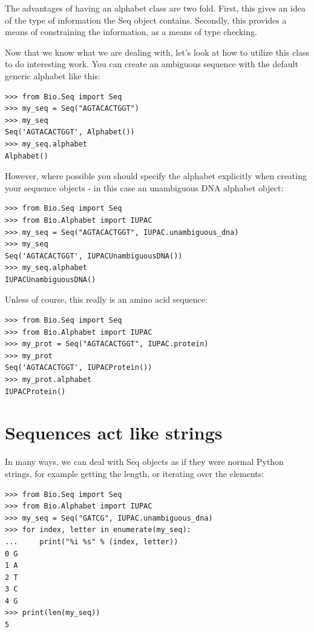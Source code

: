\documentclass{report}
\begin{document}
The advantages of having an alphabet class are two fold. First, this gives an idea of the type of information the Seq object contains. Secondly, this provides a means of constraining the information, as a means of type checking.

Now that we know what we are dealing with, let's look at how to utilize this class to do interesting work.
You can create an ambiguous sequence with the default generic alphabet like this:

\begin{verbatim}
>>> from Bio.Seq import Seq
>>> my_seq = Seq("AGTACACTGGT")
>>> my_seq
Seq('AGTACACTGGT', Alphabet())
>>> my_seq.alphabet
Alphabet()
\end{verbatim}

However, where possible you should specify the alphabet explicitly when creating your sequence objects - in this case an unambiguous DNA alphabet object:

\begin{verbatim}
>>> from Bio.Seq import Seq
>>> from Bio.Alphabet import IUPAC
>>> my_seq = Seq("AGTACACTGGT", IUPAC.unambiguous_dna)
>>> my_seq
Seq('AGTACACTGGT', IUPACUnambiguousDNA())
>>> my_seq.alphabet
IUPACUnambiguousDNA()
\end{verbatim}

Unless of course, this really is an amino acid sequence:

\begin{verbatim}
>>> from Bio.Seq import Seq
>>> from Bio.Alphabet import IUPAC
>>> my_prot = Seq("AGTACACTGGT", IUPAC.protein)
>>> my_prot
Seq('AGTACACTGGT', IUPACProtein())
>>> my_prot.alphabet
IUPACProtein()
\end{verbatim}

\section{Sequences act like strings}

In many ways, we can deal with Seq objects as if they were normal Python strings, for example getting the length, or iterating over the elements:

\begin{verbatim}
>>> from Bio.Seq import Seq
>>> from Bio.Alphabet import IUPAC
>>> my_seq = Seq("GATCG", IUPAC.unambiguous_dna)
>>> for index, letter in enumerate(my_seq):
...     print("%i %s" % (index, letter))
0 G
1 A
2 T
3 C
4 G
>>> print(len(my_seq))
5
\end{verbatim}
\end{document}
